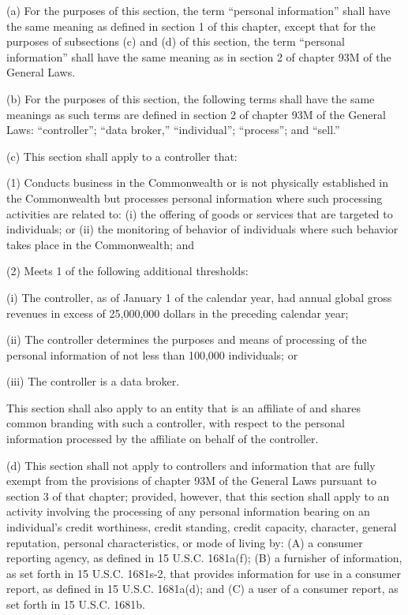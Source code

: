 (a) For the purposes of this section, the term “personal information” shall have the same meaning as defined in section 1 of this chapter, except that for the purposes of subsections (c) and (d) of this section, the term “personal information” shall have the same meaning as in section 2 of chapter 93M of the General Laws. 

(b) For the purposes of this section, the following terms shall have the same meanings as such terms are defined in section 2 of chapter 93M of the General Laws: “controller”; “data broker,” “individual”; “process”; and “sell.”

(c) This section shall apply to a controller that:

(1) Conducts business in the Commonwealth or is not physically established in the Commonwealth but processes personal information where such processing activities are related to: (i) the offering of goods or services that are targeted to individuals; or (ii) the monitoring of behavior of individuals where such behavior takes place in the Commonwealth; and

(2) Meets 1 of the following additional thresholds:

(i) The controller, as of January 1 of the calendar year, had annual global gross revenues in excess of 25,000,000 dollars in the preceding calendar year;

(ii) The controller determines the purposes and means of processing of the personal information of not less than 100,000 individuals; or

(iii) The controller is a data broker.

This section shall also apply to an entity that is an affiliate of and shares common branding with such a controller, with respect to the personal information processed by the affiliate on behalf of the controller.

(d) This section shall not apply to controllers and information that are fully exempt from the provisions of chapter 93M of the General Laws pursuant to section 3 of that chapter; provided, however, that this section shall apply to an activity involving the processing of any personal information bearing on an individual’s credit worthiness, credit standing, credit capacity, character, general reputation, personal characteristics, or mode of living by: (A) a consumer reporting agency, as defined in 15 U.S.C. 1681a(f); (B) a furnisher of information, as set forth in 15 U.S.C. 1681s-2, that provides information for use in a consumer report, as defined in 15 U.S.C. 1681a(d); and (C) a user of a consumer report, as set forth in 15 U.S.C. 1681b.

